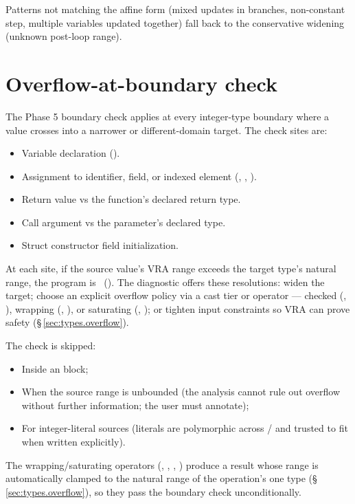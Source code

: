 \pnum
Patterns not matching the affine form (mixed updates in branches,
non-constant step, multiple variables updated together) fall back to
the conservative widening (unknown post-loop range).

\section{Overflow-at-boundary check}
\label{sec:vra.boundary}

\pnum
The Phase 5 boundary check applies at every integer-type boundary
where a value crosses into a narrower or different-domain target.
The check sites are:
\begin{itemize}
  \item Variable declaration ().
  \item Assignment to identifier, field, or indexed element
        (, , ).
  \item Return value vs the function's declared return type.
  \item Call argument vs the parameter's declared type.
  \item Struct constructor field initialization.
\end{itemize}

\pnum
At each site, if the source value's VRA range exceeds the target type's
natural range, the program is \illformed{}~(). The
diagnostic offers these resolutions: widen the target; choose an explicit
overflow policy via a cast tier or operator --- checked (,
), wrapping (, \lain{+\%}), or saturating (,
\lain{+|}); or tighten input constraints so VRA can prove safety
(\S\,\ref{sec:types.overflow}).

\pnum
The check is skipped:
\begin{itemize}
  \item Inside an  block;
  \item When the source range is unbounded (the analysis cannot rule out
        overflow without further information; the user must annotate);
  \item For integer-literal sources (literals are polymorphic across
        / and trusted to fit when written explicitly).
\end{itemize}

\pnum
The wrapping/saturating operators (\tok{+\%}, \tok{*\%}, \tok{+|}, \tok{*|})
produce a result whose range is automatically clamped to the natural range of the
operation's one type (\S\,\ref{sec:types.overflow}), so they pass the boundary check
unconditionally.

